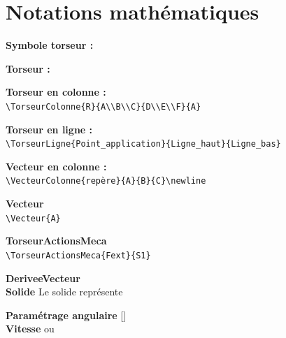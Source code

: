 \documentclass[b,e,cours]{D:/Dropbox/enseignement/CPGE/raphaelpoiree/paquets/classe_kara}
\begin{document}
\section{Notations mathématiques}
\begin{frame}
\textbf{Symbole torseur :}\\
\SymboleTorseur

\textbf{Torseur :}\\
 

\textbf{Torseur en colonne :}\\
\newline
\verb$\TorseurColonne{R}{A\\B\\C}{D\\E\\F}{A}$

\textbf{Torseur en ligne :}\\
\newline
\verb$\TorseurLigne{Point_application}{Ligne_haut}{Ligne_bas}$

\textbf{Vecteur en colonne :}\\
\newline
\verb$\VecteurColonne{repère}{A}{B}{C}\newline$

\textbf{Vecteur}\\
\newline
\verb$\Vecteur{A}$

\textbf{TorseurActionsMeca}\\
\newline
\verb$\TorseurActionsMeca{Fext}{S1}$

\textbf{DeriveeVecteur}\\

\textbf{Solide}
Le solide  représente

\textbf{Paramétrage angulaire}\newline
{}[]\\

\textbf{Vitesse}\newline
{} ou \\


\end{frame}
\end{document}
